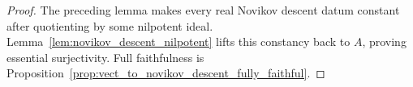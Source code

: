 \begin{proof}
  \leanok
  The preceding lemma makes every real Novikov descent datum constant after
  quotienting by some nilpotent ideal.  Lemma~\ref{lem:novikov_descent_nilpotent}
  lifts this constancy back to $A$, proving essential surjectivity.  Full
  faithfulness is
  Proposition~\ref{prop:vect_to_novikov_descent_fully_faithful}.
\end{proof}
